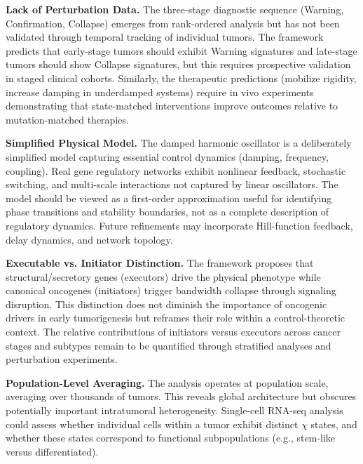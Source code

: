\documentclass[11pt,letterpaper]{article}
\begin{document}
\textbf{Lack of Perturbation Data.} The three-stage diagnostic sequence (Warning, Confirmation, Collapse) emerges from rank-ordered analysis but has not been validated through temporal tracking of individual tumors. The framework predicts that early-stage tumors should exhibit Warning signatures and late-stage tumors should show Collapse signatures, but this requires prospective validation in staged clinical cohorts. Similarly, the therapeutic predictions (mobilize rigidity, increase damping in underdamped systems) require in vivo experiments demonstrating that state-matched interventions improve outcomes relative to mutation-matched therapies.

\textbf{Simplified Physical Model.} The damped harmonic oscillator is a deliberately simplified model capturing essential control dynamics (damping, frequency, coupling). Real gene regulatory networks exhibit nonlinear feedback, stochastic switching, and multi-scale interactions not captured by linear oscillators. The model should be viewed as a first-order approximation useful for identifying phase transitions and stability boundaries, not as a complete description of regulatory dynamics. Future refinements may incorporate Hill-function feedback, delay dynamics, and network topology.

\textbf{Executable vs. Initiator Distinction.} The framework proposes that structural/secretory genes (executors) drive the physical phenotype while canonical oncogenes (initiators) trigger bandwidth collapse through signaling disruption. This distinction does not diminish the importance of oncogenic drivers in early tumorigenesis but reframes their role within a control-theoretic context. The relative contributions of initiators versus executors across cancer stages and subtypes remain to be quantified through stratified analyses and perturbation experiments.

\textbf{Population-Level Averaging.} The analysis operates at population scale, averaging over thousands of tumors. This reveals global architecture but obscures potentially important intratumoral heterogeneity. Single-cell RNA-seq analysis could assess whether individual cells within a tumor exhibit distinct $\chi$ states, and whether these states correspond to functional subpopulations (e.g., stem-like versus differentiated).
\end{document}

